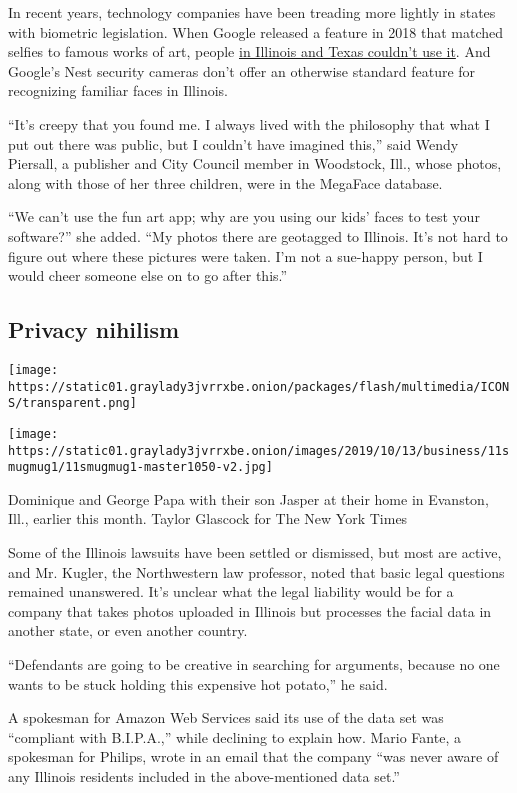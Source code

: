 In recent years, technology companies have been treading more lightly in
states with biometric legislation. When Google released a feature in
2018 that matched selfies to famous works of art, people
\href{https://www.wsj.com/articles/why-google-wont-search-for-art-look-alike-in-some-states-1516194001}{in
Illinois and Texas couldn't use it}. And Google's Nest security cameras
don't offer an otherwise standard feature for recognizing familiar faces
in Illinois.

``It's creepy that you found me. I always lived with the philosophy that
what I put out there was public, but I couldn't have imagined this,''
said Wendy Piersall, a publisher and City Council member in Woodstock,
Ill., whose photos, along with those of her three children, were in the
MegaFace database.

``We can't use the fun art app; why are you using our kids' faces to
test your software?'' she added. ``My photos there are geotagged to
Illinois. It's not hard to figure out where these pictures were taken.
I'm not a sue-happy person, but I would cheer someone else on to go
after this.''

\hypertarget{privacy-nihilism}{%
\subsection{Privacy nihilism}\label{privacy-nihilism}}

\texttt{[image: https://static01.graylady3jvrrxbe.onion/packages/flash/multimedia/ICONS/transparent.png]}

\texttt{[image: https://static01.graylady3jvrrxbe.onion/images/2019/10/13/business/11smugmug1/11smugmug1-master1050-v2.jpg]}

Dominique and George Papa with their son Jasper at their home in
Evanston, Ill., earlier this month. Taylor Glascock for The New York
Times

Some of the Illinois lawsuits have been settled or dismissed, but most
are active, and Mr. Kugler, the Northwestern law professor, noted that
basic legal questions remained unanswered. It's unclear what the legal
liability would be for a company that takes photos uploaded in Illinois
but processes the facial data in another state, or even another country.

``Defendants are going to be creative in searching for arguments,
because no one wants to be stuck holding this expensive hot potato,'' he
said.

A spokesman for Amazon Web Services said its use of the data set was
``compliant with B.I.P.A.,'' while declining to explain how. Mario
Fante, a spokesman for Philips, wrote in an email that the company ``was
never aware of any Illinois residents included in the above-mentioned
data set.''

